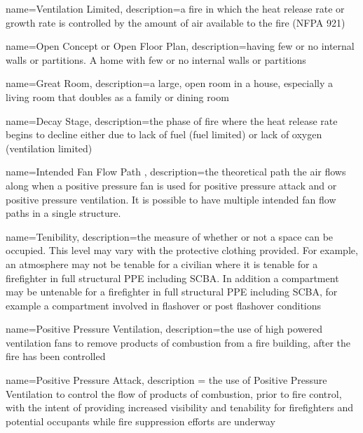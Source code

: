 {
	name=Ventilation Limited,
	description={a fire in which the heat release rate or growth rate is controlled by the amount of air available to the fire (NFPA 921)}
}

{
	name=Open Concept or Open Floor Plan,
	description={having few or no internal walls or partitions. A home with few or no internal walls or partitions}
}

{
	name=Great Room,
	description={a large, open room in a house, especially a living room that doubles as a family or dining room}
}

{
	name=Decay Stage,
	description={the phase of fire where the heat release rate begins to decline either due to lack of fuel (fuel limited) or lack of oxygen (ventilation limited)}
}

{
	name=Intended Fan Flow Path ,
	description={the theoretical path the air flows along when a positive pressure fan is used for positive pressure attack and or positive pressure ventilation. It is possible to have multiple intended fan flow paths in a single structure.}
}

{
	name=Tenibility,
	description={the measure of whether or not a space can be occupied. This level may vary with the protective clothing provided. For example, an atmosphere may not be tenable for a civilian where it is tenable for a firefighter in full structural PPE including SCBA. In addition a compartment may be untenable for a firefighter in full structural PPE including SCBA, for example a compartment involved in flashover or post flashover conditions}
}


{
	name={Positive Pressure Ventilation},
	description={the use of high powered ventilation fans to remove products of combustion from a fire building, after the fire has been controlled}
}

{
	name={Positive Pressure Attack},
	description = {the use of Positive Pressure Ventilation to control the flow of products of combustion, prior to fire control, with the intent of providing increased visibility and tenability for firefighters and potential occupants while fire suppression efforts are underway}
}